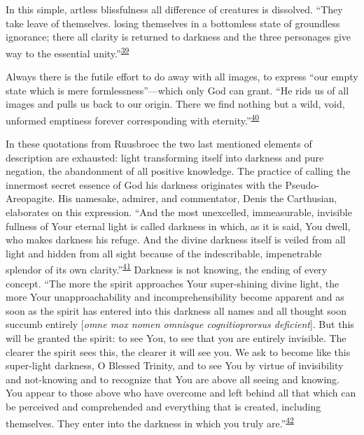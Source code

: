 In this simple, artless blissfulness all difference of creatures is
dissolved. ``They take leave of themselves. losing themselves in a
bottomless state of groundless ignorance; there all clarity is returned
to darkness and the three personages give way to the essential
unity.''\textsuperscript{\protect\hypertarget{17_Chapter_Ten__THE_FAILURE_OF_IMAG.xhtmlux5cux23id_659}{\protect\hyperlink{23_NOTES.xhtmlux5cux23id_660}{39}}}

Always there is the futile effort to do away with all images, to express
``our empty state which is mere formlessness''---which only God can
grant. ``He rids us of all images and pulls us back to our origin. There
we find nothing but a wild, void, unformed emptiness forever
corresponding with
eternity.''\textsuperscript{\protect\hypertarget{17_Chapter_Ten__THE_FAILURE_OF_IMAG.xhtmlux5cux23id_657}{\protect\hyperlink{23_NOTES.xhtmlux5cux23id_658}{40}}}

In these quotations from Ruusbroec the two last mentioned elements of
description are exhausted: light transforming itself into darkness and
pure negation, the abandonment of all positive knowledge. The practice
of calling the innermost secret essence of God his darkness originates
with the Pseudo-Areopagite. His namesake, admirer, and commentator,
Denis the Carthusian, elaborates on this expression. ``And the most
unexcelled, immeasurable, invisible fullness of Your eternal light is
called darkness in which, as it is said, You dwell, who makes darkness
his refuge. And the divine darkness itself is veiled from all light and
hidden from all sight because of the indescribable, impenetrable
splendor of its own
clarity.''\textsuperscript{\protect\hypertarget{17_Chapter_Ten__THE_FAILURE_OF_IMAG.xhtmlux5cux23id_655}{\protect\hyperlink{23_NOTES.xhtmlux5cux23id_656}{41}}}
Darkness is not knowing, the ending of every concept. ``The more the
spirit approaches Your super-shining divine light, the more Your
unapproachability and incomprehensibility become apparent and as soon as
the spirit has entered into this darkness all names and all thought soon
succumb entirely {[}\emph{omne mox nomen omnisque cognitioprorsus
deficient}{]}. But this will be granted the spirit: to see You, to see
that you are entirely invisible. The clearer the spirit sees this, the
clearer it will see you. We ask to
\protect\hypertarget{17_Chapter_Ten__THE_FAILURE_OF_IMAG.xhtmlux5cux23page_262}{}{}become
like this super-light darkness, O Blessed Trinity, and to see You by
virtue of invisibility and not-knowing and to recognize that You are
above all seeing and knowing. You appear to those above who have
overcome and left behind all that which can be perceived and
comprehended and everything that is created, including themselves. They
enter into the darkness in which you truly
are.''\textsuperscript{\protect\hypertarget{17_Chapter_Ten__THE_FAILURE_OF_IMAG.xhtmlux5cux23id_653}{\protect\hyperlink{23_NOTES.xhtmlux5cux23id_654}{42}}}

